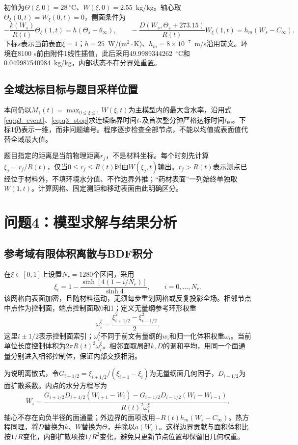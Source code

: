 \documentclass[withoutpreface]{cumcmthesis}
\begin{document}
初值为$\Theta(\xi,0)=28~{}^\circ$C、$W(\xi,0)=2.55$~kg/kg。轴心取$\Theta_\xi(0,t)=W_\xi(0,t)=0$，侧面条件为
\begin{equation}\label{eq:q4_boundary}
-\frac{k(W_s)}{R(t)}\Theta_\xi(1,t)=h(\Theta_s-\theta_\infty),\qquad
-\frac{D(W_s,\Theta_s+273.15)}{R(t)}W_\xi(1,t)=h_m(W_s-C_\infty).
\end{equation}
下标$s$表示当前表面$\xi=1$；$h=25$~W/(m$^2\!\cdot$K)、$h_m=8\times10^{-7}$~m/s沿用前文。环境在8100 s前由附件1线性插值，此后采用49.9989344262~$^\circ$C和0.049987540984~kg/kg，内部状态不在分界处重置。

\subsection{全域达标目标与题目采样位置}
本问仍以$M_1(t)=\max_{0\le\xi\le1}W(\xi,t)$为主模型内的最大含水率，沿用式\eqref{eq:q3_event}、\eqref{eq:q3_stop}求连续临界时间$t_*$及首次整分钟严格达标时间$t_{60}$。下标1仍表示一维，而非问题编号。程序逐步检查全部节点，不能以均值或表面值代替全域最大值。

题目指定的距离是当前物理距离$r_j$，不是材料坐标。每个时刻先计算$\xi_j=r_j/R(t)$，仅当$0\le r_j\le R(t)$时由$W(\xi_j,t)$输出。$r_j>R(t)$表示测点已经位于材料外，不填环境水分值、不作边界外推；“药材表面”一列始终单独取$W(1,t)$。计算网格、固定测距和移动表面由此明确区分。
\section{问题4：模型求解与结果分析}
\subsection{参考域有限体积离散与BDF积分}
在$\xi\in[0,1]$上设置$N_r=1280$个区间，采用
\[
\xi_i=1-\frac{\sinh[4(1-i/N_r)]}{\sinh4},\qquad i=0,\ldots,N_r.
\]
该网格向表面加密，且随材料运动，无须每步重划网格或反复投影全场。相邻节点中点作为控制面，端点控制面取0和1；定义无量纲参考环形权重
\[
\omega_i^\xi=\frac{\xi_{i+1/2}^2-\xi_{i-1/2}^2}{2}.
\]
这里$i\pm1/2$表示控制面索引；$\omega_i^\xi$不同于前文有量纲的$w_i$和归一化体积权重$\omega_i$。当前单位长度控制体积为$2\pi R(t)^2\omega_i^\xi$。相邻面取局部$k,D$的调和平均，用同一个面通量分别进入相邻控制体，保证内部交换相消。

为说明离散式，令$G_{i+1/2}=\xi_{i+1/2}/(\xi_{i+1}-\xi_i)$为无量纲面几何因子，$D_{i+1/2}$为面扩散系数。内点的水分方程写为
\[
\dot W_i=\frac{G_{i+1/2}D_{i+1/2}(W_{i+1}-W_i)
-G_{i-1/2}D_{i-1/2}(W_i-W_{i-1})}{R(t)^2\omega_i^\xi}.
\]
轴心不存在向负半径的面通量；外边界的面项改用$-R(t)h_m(W_s-C_\infty)$。热方程同理，将$D$替换为$k$、$W$替换为$\Theta$，并除以$a(W_i)$。这样边界贡献与面积体积比按$1/R$变化，内部扩散项按$1/R^2$变化，避免只更新节点位置却保留旧几何权重。
\end{document}
